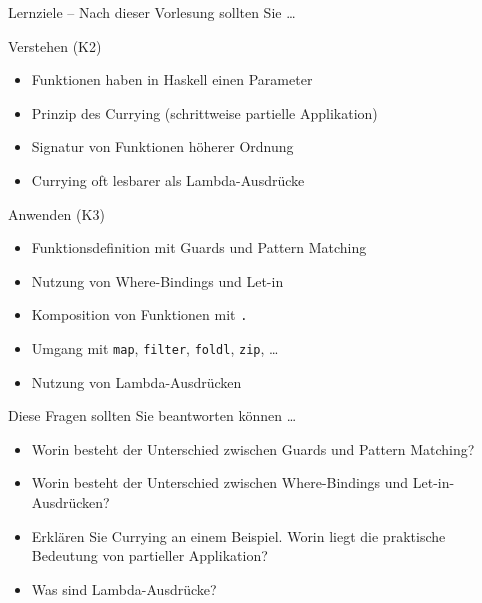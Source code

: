 \documentclass[svgnames,smaller,ngerman]{beamer}
\begin{document}
\begin{frame}[fragile]{Lernziele -- Nach dieser Vorlesung sollten Sie \ldots}
    \begin{block}{Verstehen (K2)}
        \begin{itemize}
            \item Funktionen haben in Haskell einen Parameter
            \item Prinzip des Currying (schrittweise partielle Applikation)
            \item Signatur von Funktionen höherer Ordnung
            \item Currying oft lesbarer als Lambda-Ausdrücke
        \end{itemize}
    \end{block}

    \smallskip

    \begin{block}{Anwenden (K3)}
        \begin{itemize}
            \item Funktionsdefinition mit Guards und Pattern Matching
            \item Nutzung von Where-Bindings und Let-in
            \item Komposition von Funktionen mit \verb/./
            \item Umgang mit \verb/map/, \verb/filter/, \verb/foldl/,
                  \verb/zip/, \ldots
            \item Nutzung von Lambda-Ausdrücken
        \end{itemize}
    \end{block}
\end{frame}


\begin{frame}{Diese Fragen sollten Sie beantworten können \ldots}
    \begin{itemize}
        \item Worin besteht der Unterschied zwischen Guards und Pattern
              Matching?
        \item Worin besteht der Unterschied zwischen Where-Bindings und
              Let-in-Ausdrücken?
        \item Erklären Sie Currying an einem Beispiel. Worin liegt die
              praktische Bedeutung von partieller Applikation?
        \item Was sind Lambda-Ausdrücke?
    \end{itemize}
\end{frame}
\end{document}
